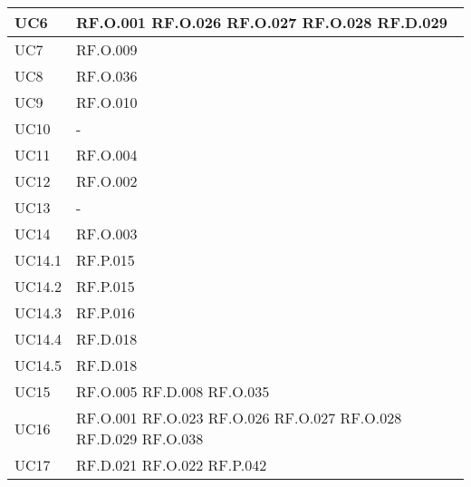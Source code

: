 \begin{table}[H]
\centering
    \begin{tabular}{|C{3.0cm}|C{3.0cm}|}
        \hline
        UC6 &
        RF.O.001 \newline
        RF.O.026 \newline
        RF.O.027 \newline
        RF.O.028 \newline
        RF.D.029 \\
        \hline
        UC7 &
        RF.O.009 \\
        \hline
        UC8 &
        RF.O.036 \\
        \hline
        UC9 &
        RF.O.010 \\
        \hline
        UC10 &
        - \\
        \hline
        UC11 &
        RF.O.004 \\
        \hline
        UC12 &
        RF.O.002 \\
        \hline
        UC13 &
        - \\
        \hline
        UC14 &
        RF.O.003 \\
        \hline
        UC14.1 &
        RF.P.015 \\
        \hline
        UC14.2 &
        RF.P.015 \\
        \hline
        UC14.3 &
        RF.P.016 \\
        \hline
        UC14.4 &
        RF.D.018 \\
        \hline
        UC14.5 &
        RF.D.018 \\
        \hline
        UC15 &
        RF.O.005 \newline
        RF.D.008 \newline
        RF.O.035 \\
        \hline
        UC16 &
        RF.O.001 \newline
        RF.O.023 \newline
        RF.O.026 \newline
        RF.O.027 \newline
        RF.O.028 \newline
        RF.D.029 \newline
        RF.O.038 \\
        \hline
        UC17 &
        RF.D.021 \newline
        RF.O.022 \newline
        RF.P.042 \\
        \hline

\end{tabular}
\end{table}
